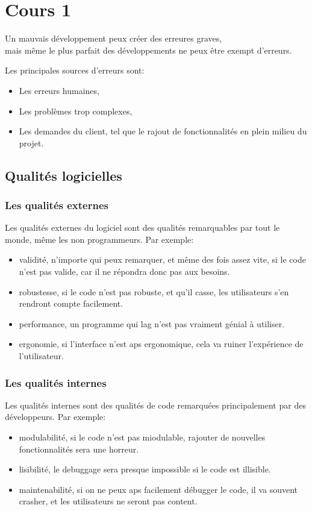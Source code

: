 \section{Cours 1}
Un mauvais développement peux créer des erreures graves,\\
mais même le plus parfait des développements ne peux être exempt d'erreurs.

Les principales sources d'erreurs sont:
\begin{itemize}
	\item Les erreurs humaines,
	\item Les problèmes trop complexes,
	\item Les demandes du client, tel que le rajout de fonctionnalités en plein milieu du projet.
\end{itemize}

\subsection{Qualités logicielles}
\subsubsection{Les qualités externes}
Les qualités externes du logiciel sont des qualités remarquables par tout le monde, même les non programmeurs.
Par exemple:
\begin{itemize}
	\item validité, n'importe qui peux remarquer, et même des fois assez vite, si le code n'est pas valide,
	car il ne répondra donc pas aux besoins.
	\item robustesse, si le code n'est pas robuste, et qu'il casse, les utilisateurs s'en rendront compte
	facilement.
	\item performance, un programme qui lag n'est pas vraiment génial à utiliser.
	\item ergonomie, si l'interface n'est aps ergonomique, cela va ruiner l'expérience de l'utilisateur.
\end{itemize}
\subsubsection{Les qualités internes}
Les qualités internes sont des qualités de code remarquées principalement par des développeurs.
Par exemple:
\begin{itemize}
	\item modulabilité, si le code n'est pas miodulable, rajouter de nouvelles fonctionnalités sera une horreur.
	\item lisibilité, le debuggage sera presque impossible si le code est illisible.
	\item maintenabilité, si on ne peux aps facilement débugger le code, il va souvent crasher, et les
	utilisateurs ne seront pas content.
\end{itemize}

